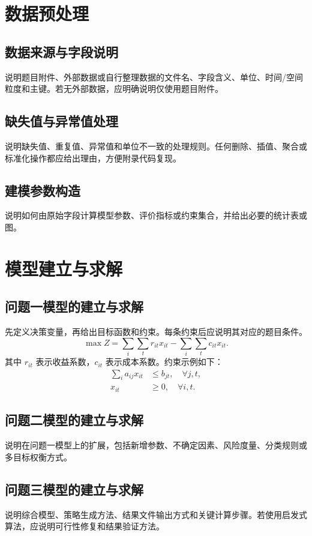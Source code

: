 \documentclass[withoutpreface,bwprint]{cumcmthesis}
\begin{document}
\section{数据预处理}
\subsection{数据来源与字段说明}
说明题目附件、外部数据或自行整理数据的文件名、字段含义、单位、时间/空间粒度和主键。若无外部数据，应明确说明仅使用题目附件。

\subsection{缺失值与异常值处理}
说明缺失值、重复值、异常值和单位不一致的处理规则。任何删除、插值、聚合或标准化操作都应给出理由，方便附录代码复现。

\subsection{建模参数构造}
说明如何由原始字段计算模型参数、评价指标或约束集合，并给出必要的统计表或图。

\section{模型建立与求解}
\subsection{问题一模型的建立与求解}
先定义决策变量，再给出目标函数和约束。每条约束后应说明其对应的题目条件。
\begin{equation}
  \max Z = \sum_{i}\sum_t r_{it}x_{it} - \sum_i\sum_t c_{it}x_{it}.
\end{equation}
其中 $r_{it}$ 表示收益系数，$c_{it}$ 表示成本系数。约束示例如下：
\begin{align}
  \sum_i a_{ij}x_{it} &\le b_{jt}, \quad \forall j,t,\\
  x_{it} &\ge 0, \quad \forall i,t.
\end{align}

\subsection{问题二模型的建立与求解}
说明在问题一模型上的扩展，包括新增参数、不确定因素、风险度量、分类规则或多目标权衡方式。

\subsection{问题三模型的建立与求解}
说明综合模型、策略生成方法、结果文件输出方式和关键计算步骤。若使用启发式算法，应说明可行性修复和结果验证方法。
\end{document}
